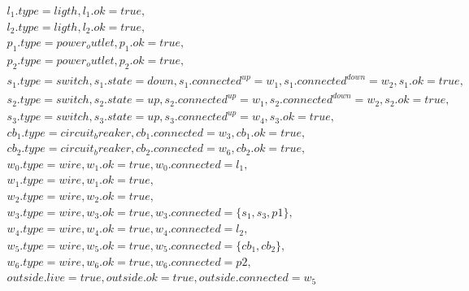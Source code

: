 \documentclass[10pt, a4paper,spanish]{article}
\begin{document}
			\begin{equation*}
				\begin{split}
					l_1.type=ligth, l_1.ok=true, \\
					l_2.type=ligth, l_2.ok=true, \\
					p_1.type=power_outlet, p_1.ok=true, \\
					p_2.type=power_outlet, p_2.ok=true, \\
					s_1.type=switch, s_1.state=down, s_1.connected^{up}=w_1, s_1.connected^{down}=w_2, s_1.ok=true, \\
					s_2.type=switch, s_2.state=up, s_2.connected^{up}=w_1, s_2.connected^{down}=w_2, s_2.ok=true, \\
					s_3.type=switch, s_3.state=up, s_3.connected^{up}=w_4, s_3.ok=true, \\
					cb_1.type=circuit_breaker, cb_1.connected=w_3, cb_1.ok=true,\\
					cb_2.type=circuit_breaker, cb_2.connected=w_6, cb_2.ok=true,\\
					w_0.type=wire, w_1.ok=true, w_0.connected=l_1,\\
					w_1.type=wire, w_1.ok=true, \\
					w_2.type=wire, w_2.ok=true, \\
					w_3.type=wire, w_3.ok=true, w_3.connected=\{s_1, s_3, p1\}, \\
					w_4.type=wire, w_4.ok=true, w_4.connected=l_2, \\
					w_5.type=wire, w_5.ok=true, w_5.connected=\{cb_1, cb_2\}, \\
					w_6.type=wire, w_6.ok=true, w_6.connected=p2, \\
					outside.live=true, outside.ok=true, outside.connected=w_5
				\end{split}
			\end{equation*}
\end{document}
